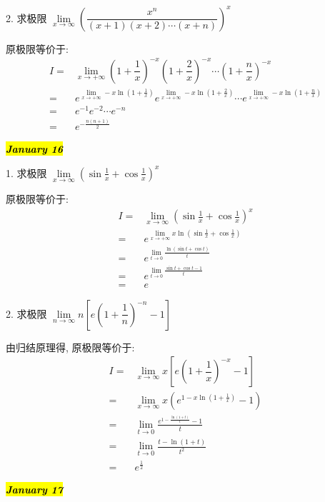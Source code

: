 2. 求极限 $\lim\limits_{x\to \infty}\left(\dfrac{x^{n}}{(x+1)(x+2)\cdots(x+n)} \right)^{x} $
\begin{solution}

	原极限等价于:
	\begin{align*}
		I = & \lim\limits_{x\to +\infty}\left(1+\dfrac{1}{x}\right)^{-x}\left(1+\dfrac{2}{x}\right)^{-x}\cdots \left(1+\dfrac{n}{x}\right)^{-x}\\
		  = & e^{\lim\limits_{x\to +\infty}-x\ln(1+\frac{1}{x})}e^{\lim\limits_{x\to +\infty}-x\ln(1+\frac{2}{x})}\cdots e^{\lim\limits_{x\to +\infty}-x\ln(1+\frac{n}{x})}\\
		  = & e^{-1}e^{-2}\cdots e^{-n}\\
		  = & e^{-\frac{n(n+1)}{2}}
	\end{align*}
\end{solution}
\hl{\textbf{\textit{January 16}}}

1. 求极限 $\lim\limits_{x\to \infty}\left(\sin\frac{1}{x}+\cos\frac{1}{x} \right)^{x} $
\begin{solution}

	原极限等价于:
	\begin{align*}
		I = & \lim\limits_{x\to \infty}\left(\sin\frac{1}{x}+\cos\frac{1}{x} \right)^{x}\\
		  = & e^{\lim\limits_{x\to +\infty}x\ln(\sin\frac{1}{x}+\cos\frac{1}{x})}\\
		  = & e^{\lim\limits_{t\to 0}\frac{\ln(\sin t+\cos t)}{t}}\\
		  = & e^{\lim\limits_{t\to 0}\frac{\sin t+\cos t-1}{t}}\\
		  = & e
	\end{align*}
\end{solution}

2. 求极限 $\lim\limits_{n\to \infty}n\left[e\left(1+\dfrac{1}{n} \right)^{-n}-1 \right]$
\begin{solution}
	
	由归结原理得, 原极限等价于:
	\begin{align*}
		I = & \lim\limits_{x\to \infty}x\left[e\left(1+\dfrac{1}{x} \right)^{-x}-1 \right]\\
		  = & \lim\limits_{x\to \infty}x(e^{1-x\ln(1+\frac{1}{x})}-1)\\
		  = & \lim\limits_{t\to 0}\frac{e^{1-\frac{\ln(1+t)}{t}}-1}{t}\\
		  = & \lim\limits_{t\to 0}\frac{t-\ln(1+t)}{t^{2}}\\
		  = & e^{\frac{1}{2}}
	\end{align*}
\end{solution}
\hl{\textbf{\textit{January 17}}}

